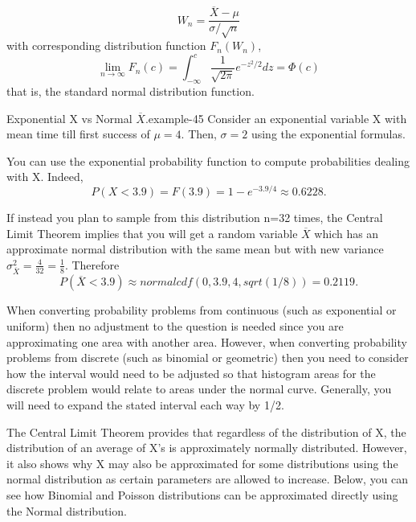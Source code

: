 \documentclass[10pt,]{book}
\numberwithin{equation}{section}
\newcommand{\lt}{<}
\begin{document}
\begin{equation*}
W_n = \frac{\overline{X} - \mu}{\sigma/ \sqrt{n}}
\end{equation*}
with corresponding distribution function \(F_n(W_n)\),%
\begin{equation*}
\lim_{n \rightarrow \infty} F_n(c) = \int_{-\infty}^c \frac{1}{\sqrt{2 \pi}} e^{-z^2/2} dz = \Phi(c)
\end{equation*}
that is, the standard normal distribution function.%
\begin{example}{Exponential X vs Normal \(\overline{X}\).}{example-45}%
\hypertarget{p-1224}{}%
Consider an exponential variable X with mean time till first success of \(\mu = 4\).  Then, \(\sigma = 2\) using the exponential formulas.%
\par
\hypertarget{p-1225}{}%
You can use the exponential probability function to compute probabilities dealing with X. Indeed,%
\begin{equation*}
P(X \lt 3.9) = F(3.9) = 1 - e^{-3.9/4} \approx 0.6228 .
\end{equation*}
%
\par
\hypertarget{p-1226}{}%
If instead you plan to sample from this distribution n=32 times, the Central Limit Theorem implies that you will get a random variable \(\overline{X}\) which has an approximate normal distribution with the same mean but with new variance \(\sigma_{\overline{X}}^2 = \frac{4}{32} = \frac{1}{8}\).  Therefore%
\begin{equation*}
P( \overline{X} \lt 3.9 ) \approx normalcdf(0,3.9,4,sqrt(1/8)) = 0.2119 .
\end{equation*}
%
\end{example}
\hypertarget{p-1227}{}%
When converting probability problems from continuous (such as exponential or uniform) then no adjustment to the question is needed since you are approximating one area with another area. However, when converting probability problems from discrete (such as binomial or geometric) then you need to consider how the interval would need to be adjusted so that histogram areas for the discrete problem would relate to areas under the normal curve. Generally, you will need to expand the stated interval each way by 1/2.%
\par
\hypertarget{p-1228}{}%
The Central Limit Theorem provides that regardless of the distribution of X, the distribution of an average of X's is approximately normally distributed. However, it also shows why X may also be approximated for some distributions using the normal distribution as certain parameters are allowed to increase. Below, you can see how Binomial and Poisson distributions can be approximated directly using the Normal distribution.%
\end{document}
